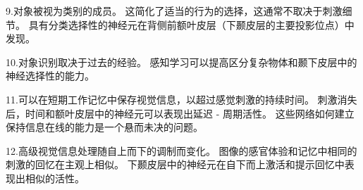 9.对象被视为类别的成员。
这简化了适当的行为的选择，这通常不取决于刺激细节。 具有分类选择性的神经元在背侧前额叶皮层（下颞皮层的主要投影位点）中发现。


10.对象识别取决于过去的经验。
感知学习可以提高区分复杂物体和颞下皮层中的神经选择性的能力。


11.可以在短期工作记忆中保存视觉信息，以超过感觉刺激的持续时间。
刺激消失后，时间和额叶皮层中的神经元可以表现出延迟 - 周期活性。
这些网络如何建立保持信息在线的能力是一个悬而未决的问题。


12.高级视觉信息处理随自上而下的调制而变化。
图像的感官体验和记忆中相同的刺激的回忆在主观上相似。
下颞皮层中的神经元在自下而上激活和提示回忆中表现出相似的活性。


